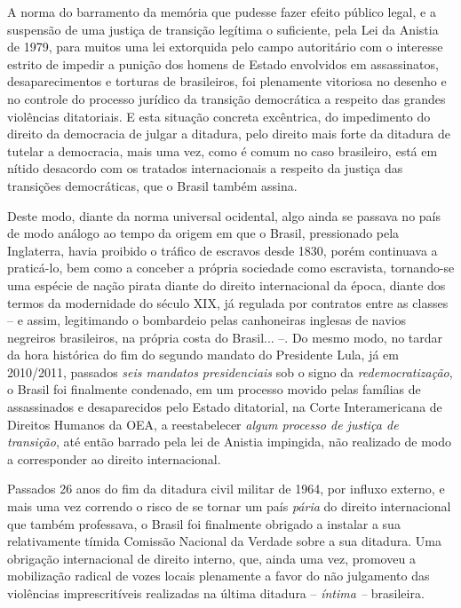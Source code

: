 A norma do barramento da memória que pudesse fazer efeito público legal,
e a suspensão de uma justiça de transição legítima o suficiente, pela
Lei da Anistia de 1979, para muitos uma lei extorquida pelo campo
autoritário com o interesse estrito de impedir a punição dos homens de
Estado envolvidos em assassinatos, desaparecimentos e torturas de
brasileiros, foi plenamente vitoriosa no desenho e no controle do
processo jurídico da transição democrática a respeito das grandes
violências ditatoriais. E esta situação concreta excêntrica, do
impedimento do direito da democracia de julgar a ditadura, pelo direito
mais forte da ditadura de tutelar a democracia, mais uma vez, como é
comum no caso brasileiro, está em nítido desacordo com os tratados
internacionais a respeito da justiça das transições democráticas, que o
Brasil também assina.

Deste modo, diante da norma universal ocidental, algo ainda se passava
no país de modo análogo ao tempo da origem em que o Brasil, pressionado
pela Inglaterra, havia proibido o tráfico de escravos desde 1830, porém
continuava a praticá-lo, bem como a conceber a própria sociedade como
escravista, tornando-se uma espécie de nação pirata diante do direito
internacional da época, diante dos termos da modernidade do século XIX,
já regulada por contratos entre as classes -- e assim, legitimando o
bombardeio pelas canhoneiras inglesas de navios negreiros brasileiros,
na própria costa do Brasil... --. Do mesmo modo, no tardar da hora
histórica do fim do segundo mandato do Presidente Lula, já em 2010/2011,
passados \emph{seis mandatos presidenciais} sob o signo da
\emph{redemocratização}, o Brasil foi finalmente condenado, em um
processo movido pelas famílias de assassinados e desaparecidos pelo
Estado ditatorial, na Corte Interamericana de Direitos Humanos da OEA, a
reestabelecer \emph{algum processo de justiça de transição}, até então
barrado pela lei de Anistia impingida, não realizado de modo a
corresponder ao direito internacional.

Passados 26 anos do fim da ditadura civil militar de 1964, por influxo
externo, e mais uma vez correndo o risco de se tornar um país
\emph{pária} do direito internacional que também professava, o Brasil
foi finalmente obrigado a instalar a sua relativamente tímida Comissão
Nacional da Verdade sobre a sua ditadura. Uma obrigação internacional de
direito interno, que, ainda uma vez, promoveu a mobilização radical de
vozes locais plenamente a favor do não julgamento das violências
imprescritíveis realizadas na última ditadura -- \emph{íntima --}
brasileira.

